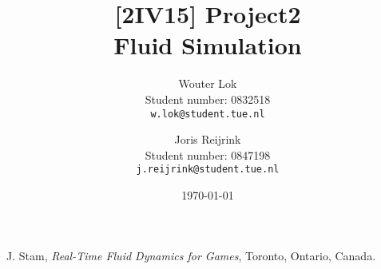 \documentclass[a4paper,twoside,11pt]{article}
\title{\sffamily\bfseries
[2IV15] Project2 \\[1ex]
\large Fluid Simulation
}
\author{
    Wouter Lok \\
    Student number: 0832518 \\
    \texttt{w.lok@student.tue.nl}
    \and
    Joris Reijrink \\
    Student number: 0847198 \\
    \texttt{j.reijrink@student.tue.nl}\\
}
\date{\today}
\begin{document}
\maketitle
\newpage








\begin{thebibliography}{1}
    J. Stam,
    \emph{Real-Time Fluid Dynamics for Games},
    Toronto, Ontario, Canada.
\end{thebibliography}
    
\end{document}
